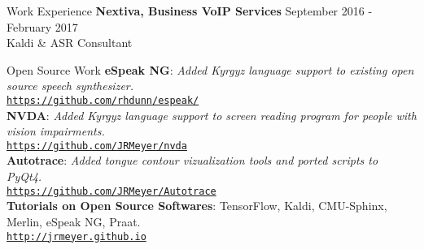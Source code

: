 \documentclass{resume} %
\begin{document}

\vspace{.25cm}

\begin{rSection}{Work Experience}
{\bf Nextiva, Business VoIP Services} \hfill {September 2016 - February 2017} \\ 
Kaldi \& ASR Consultant  \hfill {} \\
\end{rSection}



\vspace{.25cm}

\begin{rSection}{Open Source Work}
{\textbf{eSpeak NG}:} {\textit{Added Kyrgyz language support to existing open source speech synthesizer.}} \\
 {\href{https://github.com/rhdunn/espeak/commits?author=JRMeyer}{\texttt{https://github.com/rhdunn/espeak/}}}{} \\

{\textbf{NVDA}:} {\textit{Added Kyrgyz language support to screen reading program for people with vision impairments.}} \\
 {\href{https://github.com/JRMeyer/nvda}{\texttt{https://github.com/JRMeyer/nvda}}}{} \\

{\textbf{Autotrace}:} {\textit{Added tongue contour vizualization tools and ported scripts to PyQt4.}} \\
 {\href{https://github.com/JRMeyer/Autotrace}{\texttt{https://github.com/JRMeyer/Autotrace}}}{} \\

{\textbf{Tutorials on Open Source Softwares}:} {TensorFlow, Kaldi, CMU-Sphinx, Merlin, eSpeak NG, Praat.}\\
 {\href{http://jrmeyer.github.io/}{\texttt{http://jrmeyer.github.io}}}{} \\
\end{rSection}



\vspace{.25cm}
\end{document}
